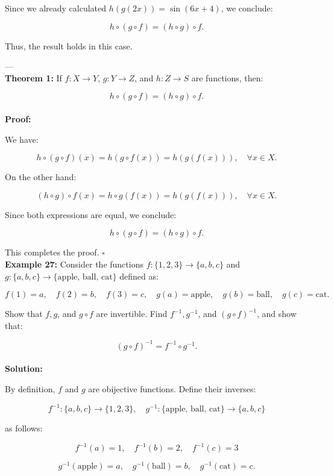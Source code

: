 \documentclass[12pt]{article}
\begin{document}
Since we already calculated \( h(g(2x)) = \sin(6x + 4) \), we conclude:

\[
h \circ ( g \circ f ) = (h \circ g) \circ f.
\]

Thus, the result holds in this case.

---
\\

\textbf{Theorem 1:}  
If \( f: X \to Y \), \( g: Y \to Z \), and \( h: Z \to S \) are functions, then:

\[
h \circ ( g \circ f ) = (h \circ g) \circ f.
\]\\

\textbf{Proof:}  

We have:

\[
h \circ ( g \circ f )(x) = h( g \circ f (x)) = h(g(f(x))), \quad \forall x \in X.
\]

On the other hand:

\[
(h \circ g) \circ f (x) = h \circ g (f (x)) = h(g(f(x))), \quad \forall x \in X.
\]

Since both expressions are equal, we conclude:

\[
h \circ ( g \circ f ) = (h \circ g) \circ f.
\]

This completes the proof. \(\square\)\\

\textbf{Example 27:}  
Consider the functions \( f: \{1, 2, 3\} \to \{a, b, c\} \) and \( g: \{a, b, c\} \to \{\text{apple, ball, cat}\} \) defined as:

\[
f(1) = a, \quad f(2) = b, \quad f(3) = c, \quad g(a) = \text{apple}, \quad g(b) = \text{ball}, \quad g(c) = \text{cat}.
\]

Show that \( f, g \), and \( g \circ f \) are invertible. Find \( f^{-1}, g^{-1} \), and \( (g \circ f)^{-1} \), and show that:

\[
(g \circ f)^{-1} = f^{-1} \circ g^{-1}.
\]
\\
\textbf{Solution:}  

By definition, \( f \) and \( g \) are obijective functions. Define their inverses:

\[
f^{-1}: \{a, b, c\} \to \{1, 2, 3\}, \quad g^{-1}: \{\text{apple, ball, cat}\} \to \{a, b, c\}
\]

as follows:

\[
f^{-1}(a) = 1, \quad f^{-1}(b) = 2, \quad f^{-1}(c) = 3
\]

\[
g^{-1}(\text{apple}) = a, \quad g^{-1}(\text{ball}) = b, \quad g^{-1}(\text{cat}) = c.
\]
\end{document}
